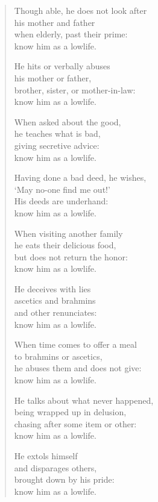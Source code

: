 \documentclass[12pt,openany]{book}%
\begin{document}
\begin{verse}
Though able, he does not look after \\
his mother and father \\
when elderly, past their prime: \\
know him as a lowlife. 

He hits or verbally abuses \\
his mother or father, \\
brother, sister, or mother-in-law: \\
know him as a lowlife. 

When asked about the good, \\
he teaches what is bad, \\
giving secretive advice: \\
know him as a lowlife. 

Having done a bad deed, he wishes, \\
‘May no-one find me out!’ \\
His deeds are underhand: \\
know him as a lowlife. 

When visiting another family \\
he eats their delicious food, \\
but does not return the honor: \\
know him as a lowlife. 

He deceives with lies \\
ascetics and brahmins \\
and other renunciates: \\
know him as a lowlife. 

When time comes to offer a meal \\
to brahmins or ascetics, \\
he abuses them and does not give: \\
know him as a lowlife. 

He talks about what never happened, \\
being wrapped up in delusion, \\
chasing after some item or other: \\
know him as a lowlife. 

He extols himself \\
and disparages others, \\
brought down by his pride: \\
know him as a lowlife. 


\end{verse}
\end{document}

